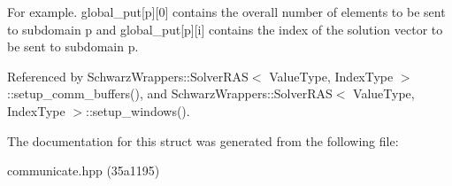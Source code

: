 For example. global\+\_\+put\mbox{[}p\mbox{]}\mbox{[}0\mbox{]} contains the overall number of elements to be sent to subdomain p and global\+\_\+put\mbox{[}p\mbox{]}\mbox{[}i\mbox{]} contains the index of the solution vector to be sent to subdomain p. 

Referenced by Schwarz\+Wrappers\+::\+Solver\+R\+A\+S$<$ Value\+Type, Index\+Type $>$\+::setup\+\_\+comm\+\_\+buffers(), and Schwarz\+Wrappers\+::\+Solver\+R\+A\+S$<$ Value\+Type, Index\+Type $>$\+::setup\+\_\+windows().



The documentation for this struct was generated from the following file\+:\begin{DoxyCompactItemize}
\item 
communicate.\+hpp (35a1195)\end{DoxyCompactItemize}
